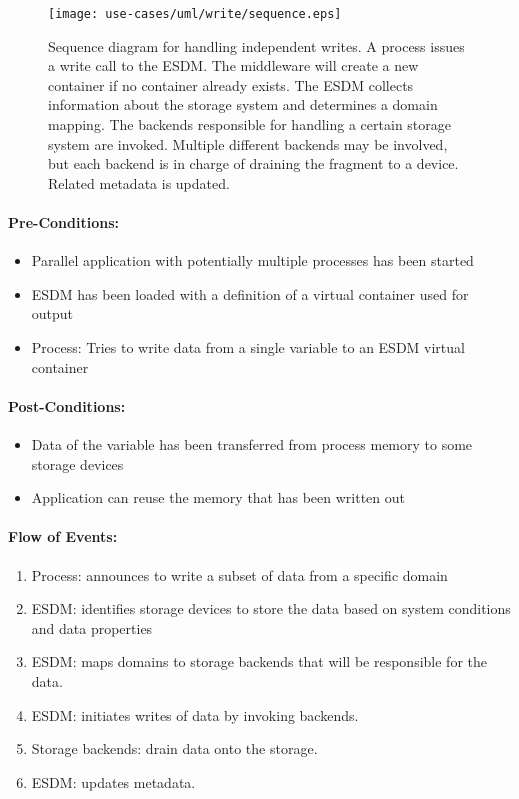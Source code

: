 \begin{figure}
	\centering
	\texttt{[image: use-cases/uml/write/sequence.eps]}
	\caption{Sequence diagram for handling independent writes. A process issues a write call to the ESDM. The middleware will create a new container if no container already exists. The ESDM collects information about the storage system and determines a domain mapping. The backends responsible for handling a certain storage system are invoked. Multiple different backends may be involved, but each backend is in charge of draining the fragment to a device. Related metadata is updated.}
	\label{fig:sequence independent write}
\end{figure}



\paragraph{Pre-Conditions:}

\begin{itemize}
	\item Parallel application with potentially multiple processes has been started
	\item ESDM has been loaded with a definition of a virtual container used for output
	\item Process: Tries to write data from a single variable to an ESDM virtual container
\end{itemize}

\paragraph{Post-Conditions:}
  \begin{itemize}
  \item Data of the variable has been transferred from process memory to some storage devices
  \item Application can reuse the memory that has been written out
  \end{itemize}

\paragraph{Flow of Events:}
\begin{enumerate}
	\item Process: announces to write a subset of data from a specific domain
	\item ESDM: identifies storage devices to store the data based on system conditions and data properties
	\item ESDM: maps domains to storage backends that will be responsible for the data.
	\item ESDM: initiates writes of data by invoking backends.
	\item Storage backends: drain data onto the storage.
	\item ESDM: updates metadata.
\end{enumerate}

